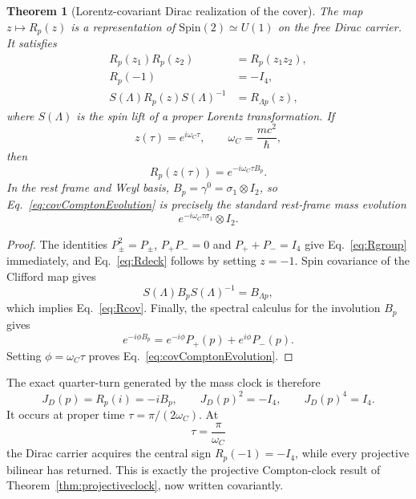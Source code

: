 \documentclass[11pt]{article}
\newtheorem{theorem}{Theorem}[section]
\theoremstyle{definition}\newtheorem{definition}[theorem]{Definition}
\theoremstyle{remark}\newtheorem{remark}[theorem]{Remark}\newtheorem{conjecture}[theorem]{Conjecture}
\begin{document}
\begin{theorem}[Lorentz-covariant Dirac realization of the cover]\label{thm:diraccover}
The map $z\mapsto R_p(z)$ is a representation of $\mathrm{Spin}(2)\simeq U(1)$ on the free Dirac carrier. It satisfies
\begin{align}
 R_p(z_1)R_p(z_2)&=R_p(z_1z_2),\label{eq:Rgroup}\\
 R_p(-1)&=-I_4,\label{eq:Rdeck}\\
 S(\Lambda)R_p(z)S(\Lambda)^{-1}&=R_{\Lambda p}(z),\label{eq:Rcov}
\end{align}
where $S(\Lambda)$ is the spin lift of a proper Lorentz transformation. If
\begin{equation}\label{eq:zCompton}
 z(\tau)=e^{i\omega_C\tau},\qquad \omega_C=\frac{mc^2}{\hbar},
\end{equation}
then
\begin{equation}\label{eq:covComptonEvolution}
 \boxed{
 R_p(z(\tau))
 =e^{-i\omega_C\tau B_p}.}
\end{equation}
In the rest frame and Weyl basis, $B_p=\gamma^0=\sigma_1\otimes I_2$, so Eq.~\eqref{eq:covComptonEvolution} is precisely the standard rest-frame mass evolution
\begin{equation}
 e^{-i\omega_C\tau\sigma_1}\otimes I_2.
\end{equation}
\end{theorem}
\begin{proof}
The identities $P_\pm^2=P_\pm$, $P_+P_-=0$ and $P_++P_-=I_4$ give Eq.~\eqref{eq:Rgroup} immediately, and Eq.~\eqref{eq:Rdeck} follows by setting $z=-1$. Spin covariance of the Clifford map gives
\begin{equation}
 S(\Lambda)B_pS(\Lambda)^{-1}=B_{\Lambda p},
\end{equation}
which implies Eq.~\eqref{eq:Rcov}. Finally, the spectral calculus for the involution $B_p$ gives
\begin{equation}
 e^{-i\phi B_p}=e^{-i\phi}P_+(p)+e^{i\phi}P_-(p).
\end{equation}
Setting $\phi=\omega_C\tau$ proves Eq.~\eqref{eq:covComptonEvolution}.
\end{proof}

The exact quarter-turn generated by the mass clock is therefore
\begin{equation}\label{eq:JDp}
 \boxed{
 J_D(p)=R_p(i)=-iB_p,\qquad
 J_D(p)^2=-I_4,\qquad
 J_D(p)^4=I_4.}
\end{equation}
It occurs at proper time $\tau=\pi/(2\omega_C)$. At
\begin{equation}\label{eq:DiracDeckTime}
 \tau=\frac{\pi}{\omega_C}
\end{equation}
the Dirac carrier acquires the central sign $R_p(-1)=-I_4$, while every projective bilinear has returned. This is exactly the projective Compton-clock result of Theorem~\ref{thm:projectiveclock}, now written covariantly.
\end{document}
